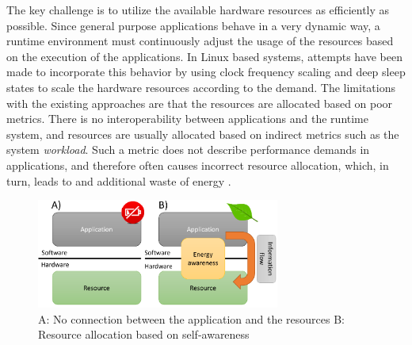 \documentclass{article}
\begin{document}
The key challenge is to utilize the available hardware resources as efficiently as possible.
Since general purpose applications behave in a very dynamic way, a runtime environment must continuously adjust the usage of the resources based on the execution of the applications.
In Linux based systems, attempts have been made to incorporate this behavior by using clock frequency scaling and deep sleep states to scale the hardware resources according to the demand. 
The limitations with the existing approaches are that the resources are allocated based on poor metrics.
There is no interoperability between applications and the runtime system, and resources are usually allocated based on indirect metrics such as the system \textit{workload}.
Such a metric does not describe performance demands in applications, and therefore often causes incorrect resource allocation,
which, in turn, leads to and additional waste of energy \cite{HolmbackaDasip, HolmbackaHipeac}.
\smallskip

\begin{figure}
    \includegraphics[width=8.0cm]{fig/EAS_Overview.png}
  \caption{A: No connection between the application and the resources B: Resource allocation based on self-awareness}
  \label{fig:EAS}
\end{figure}
\end{document}
